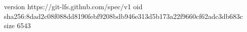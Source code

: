 version https://git-lfs.github.com/spec/v1
oid sha256:8dad2c08f088dd8190febf9208bdb946e313d5b173a22f9660cf62adc3db683c
size 6543
